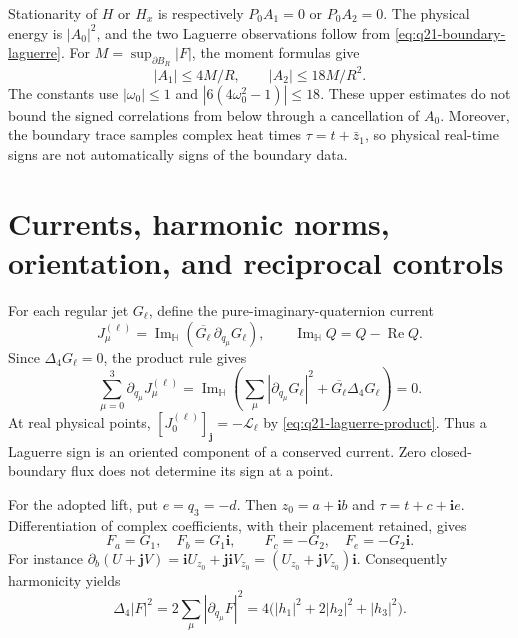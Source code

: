 \documentclass[11pt]{article}
\numberwithin{equation}{section}
\theoremstyle{definition}
\theoremstyle{remark}
\newcommand{\Lag}{\mathscr L}
\begin{document}
Stationarity of \(H\) or \(H_x\) is respectively
\(P_0A_1=0\) or \(P_0A_2=0\). The physical energy is
\(|A_0|^2\), and the two Laguerre observations follow from
\eqref{eq:q21-boundary-laguerre}. For
\(M=\sup_{\partial B_R}|F|\), the moment formulas give
\[
 |A_1|\le4M/R,\qquad |A_2|\le18M/R^2.
\]
The constants use \(|\omega_0|\le1\) and
\(|6(4\omega_0^2-1)|\le18\). These upper estimates do not bound
the signed correlations from below through a cancellation of \(A_0\).
Moreover, the boundary trace samples complex heat times
\(\tau=t+\bar z_1\), so physical real-time signs are not automatically
signs of the boundary data.

\section{Currents, harmonic norms, orientation, and reciprocal controls}
\label{sec:q21-currents}

For each regular jet \(G_\ell\), define the pure-imaginary-quaternion
current
\[
 J_\mu^{(\ell)}=\operatorname{Im}_{\mathbb H}
       (\overline{G_\ell}\,\partial_{q_\mu}G_\ell),
 \qquad \operatorname{Im}_{\mathbb H}Q=Q-\operatorname{Re}Q.
\]
Since \(\Delta_4G_\ell=0\), the product rule gives
\begin{equation}
 \sum_{\mu=0}^3\partial_{q_\mu}J_\mu^{(\ell)}
 =\operatorname{Im}_{\mathbb H}\left(
   \sum_\mu|\partial_{q_\mu}G_\ell|^2+\overline{G_\ell}\Delta_4G_\ell\right)=0.
 \label{eq:q21-current-conservation}
\end{equation}
At real physical points,
\([J_0^{(\ell)}]_{\mathbf j}=-\Lag_\ell\) by
\eqref{eq:q21-laguerre-product}. Thus a Laguerre sign is an oriented
component of a conserved current. Zero closed-boundary flux does not
determine its sign at a point.

For the adopted lift, put \(e=q_3=-d\). Then
\(z_0=a+\mathbf ib\) and \(\tau=t+c+\mathbf ie\).
Differentiation of complex coefficients, with their placement retained,
gives
\[
 F_a=G_1,\quad F_b=G_1\mathbf i,
 \qquad F_c=-G_2,\quad F_e=-G_2\mathbf i.
\]
For instance \(\partial_b(U+\mathbf jV)
=\mathbf iU_{z_0}+\mathbf j\mathbf iV_{z_0}
=(U_{z_0}+\mathbf jV_{z_0})\mathbf i\).
Consequently harmonicity yields
\begin{equation}
 \Delta_4|F|^2
 =2\sum_\mu|\partial_{q_\mu}F|^2
 =4\bigl(|h_1|^2+2|h_2|^2+|h_3|^2\bigr).
 \label{eq:q21-norm-laplacian}
\end{equation}
\end{document}
